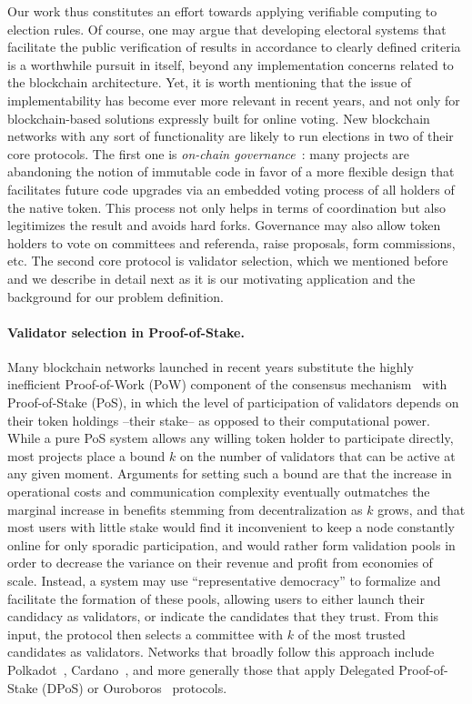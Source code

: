 Our work thus constitutes an effort towards applying verifiable computing to election rules. 
Of course, one may argue that developing electoral systems that facilitate the public verification of results in accordance to clearly defined criteria is a worthwhile pursuit in itself, beyond any implementation concerns related to the blockchain architecture.
Yet, it is worth mentioning that the issue of implementability has become ever more relevant in recent years, and not only for blockchain-based solutions expressly built for online voting. New blockchain networks with any sort of functionality are likely to run elections in two of their core protocols. 
The first one is \emph{on-chain governance}~\cite{beck2018governance}: many projects are abandoning the notion of immutable code in favor of a more flexible design that facilitates future code upgrades via an embedded voting process of all holders of the native token. This process not only helps in terms of coordination but also legitimizes the result and avoids hard forks. 
Governance may also allow token holders to vote on committees %
and referenda, %
raise proposals, form commissions, etc. 
The second core protocol is validator selection, which we mentioned before and we describe in detail next as it is our motivating application and the background for our problem definition. 

\paragraph{Validator selection in Proof-of-Stake.}
Many blockchain networks launched in recent years substitute the highly inefficient Proof-of-Work (PoW) component of the consensus mechanism~\cite{nakamoto2019bitcoin} with Proof-of-Stake (PoS), in which the level of participation of validators depends on their token holdings --their stake-- as opposed to their computational power. 
While a pure PoS system allows any willing token holder to participate directly, most projects place a bound $k$ on the number of validators that can be active at any given moment. 
Arguments for setting such a bound are that the increase in operational costs and communication complexity eventually outmatches the marginal increase in benefits stemming from decentralization as $k$ grows, and that most users with little stake would find it inconvenient to keep a node constantly online for only sporadic participation, and would rather form validation pools in order to decrease the variance on their revenue and profit from economies of scale. %
%
Instead, a system may use ``representative democracy'' to formalize and facilitate the formation of these pools, allowing users to either launch their candidacy as validators, or indicate the candidates that they trust. From this input, the protocol then selects a committee with $k$ of the most trusted candidates as validators. Networks that broadly follow this approach include Polkadot~\cite{burdges2020overview}, Cardano~\cite{brunjes2020reward}, and more generally those that apply Delegated Proof-of-Stake (DPoS) or Ouroboros~\cite{kiayias2017ouroboros} protocols. 

